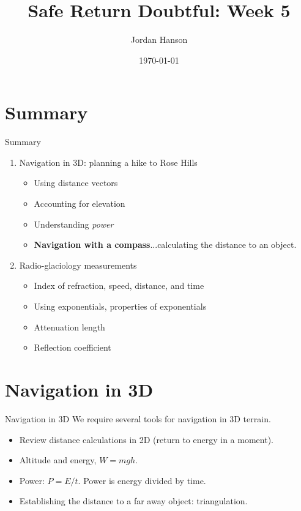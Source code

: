 \documentclass{beamer}
\title{Safe Return Doubtful: Week 5}
\date{\today}
\author{Jordan Hanson}
\institute{Whittier College Department of Physics and Astronomy}
\begin{document}
\maketitle

\section{Summary}

\begin{frame}{Summary}
\begin{enumerate}
\item Navigation in 3D: planning a hike to Rose Hills
\begin{itemize}
\item Using distance vectors
\item Accounting for elevation
\item Understanding \textit{power}
\item \textbf{Navigation with a compass}...calculating the distance to an object.
\end{itemize}
\item Radio-glaciology measurements
\begin{itemize}
\item Index of refraction, speed, distance, and time
\item Using exponentials, properties of exponentials
\item Attenuation length
\item Reflection coefficient
\end{itemize}
\end{enumerate}
\end{frame}

\section{Navigation in 3D}

\begin{frame}{Navigation in 3D}
We require several tools for navigation in 3D terrain.
\begin{itemize}
\item Review distance calculations in 2D (return to energy in a moment).
\item Altitude and energy, $W = mgh$.
\item Power: $P = E/t$.  Power is energy divided by time.
\item Establishing the distance to a far away object: triangulation.
\end{itemize}
\end{frame}
\end{document}
